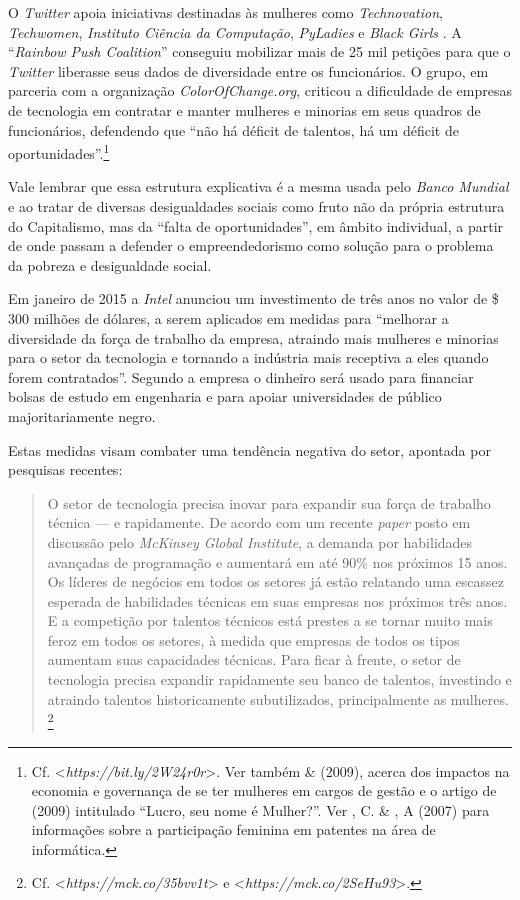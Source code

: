O \emph{Twitter} apoia iniciativas destinadas às mulheres como
\emph{Technovation}, \emph{Techwomen}, \emph{ Instituto Ciência da
Computação}, \emph{PyLadies} e \emph{Black Girls }. A
``\emph{Rainbow Push Coalition}'' conseguiu mobilizar mais de 25 mil
petições para que o \emph{Twitter} liberasse seus dados de diversidade
entre os funcionários. O grupo, em parceria com a organização
\emph{ColorOfChange.org}, criticou a dificuldade de empresas de
tecnologia em contratar e manter mulheres e minorias em seus quadros de
funcionários, defendendo que ``não há déficit de talentos, há um déficit
de oportunidades''.\footnote{Cf.
  \textless{}\emph{https://bit.ly/2W24r0r}\textgreater{}.
  Ver também  \&  (2009), acerca dos impactos na economia e
  governança de se ter mulheres em cargos de gestão e o artigo de 
  (2009) intitulado ``Lucro, seu nome é Mulher?''. Ver , C. \&
  , A (2007) para informações sobre a participação feminina em
  patentes na área de informática.}

Vale lembrar que essa estrutura explicativa é a mesma usada pelo
\emph{Banco Mundial} e \emph{} ao tratar de diversas desigualdades
sociais como fruto não da própria estrutura do Capitalismo, mas da
``falta de oportunidades'', em âmbito individual, a partir de onde
passam a defender o empreendedorismo como solução para o problema da
pobreza e desigualdade social.

Em janeiro de 2015 a \emph{Intel} anunciou um investimento de três anos
no valor de \$ 300 milhões de dólares, a serem aplicados em medidas
para ``melhorar a diversidade da força de trabalho da empresa, atraindo
mais mulheres e minorias para o setor da tecnologia e tornando a
indústria mais receptiva a eles quando forem contratados''. Segundo a
empresa o dinheiro será usado para financiar bolsas de estudo em
engenharia e para apoiar universidades de público majoritariamente
negro.

Estas medidas visam combater uma tendência negativa do setor, apontada
por pesquisas recentes:

\begin{quote}
O setor de tecnologia precisa inovar para expandir sua força de trabalho
técnica --- e rapidamente. De acordo com um recente \emph{paper} posto em
discussão pelo \emph{McKinsey Global Institute}, a demanda por
habilidades avançadas de programação e  aumentará em até 90\% nos
próximos 15 anos. Os líderes de negócios em todos os setores já estão
relatando uma escassez esperada de habilidades técnicas em suas empresas
nos próximos três anos. E a competição por talentos técnicos está
prestes a se tornar muito mais feroz em todos os setores, à medida que
empresas de todos os tipos aumentam suas capacidades técnicas. Para
ficar à frente, o setor de tecnologia precisa expandir rapidamente seu
banco de talentos, investindo e atraindo talentos historicamente
subutilizados, principalmente as mulheres. \footnote{Cf.
  \textless{}\emph{https://mck.co/35bvv1t}\textgreater{}
  e \textless{}\emph{https://mck.co/2SeHu93}\textgreater{}.}
\end{quote}

